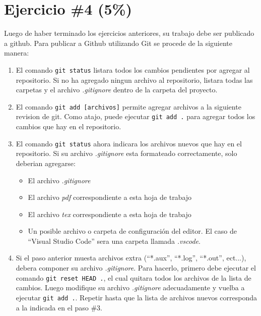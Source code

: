 \documentclass{article}
\begin{document}
\section*{Ejercicio \#4 (5\%)}
Luego de haber terminado los ejercicios anteriores, su trabajo debe
ser publicado a github. Para publicar a Github utilizando Git se procede
de la siguiente manera:
\begin{enumerate}
        \item {
                El comando \texttt{git status} listara todos los
                cambios pendientes por agregar al repositorio. Si no
                ha agregado ningun archivo al repositorio, listara todas
                las carpetas y el archivo \emph{.gitignore} dentro de la
                carpeta del proyecto.
        }
        \item{
                El comando \texttt{git add [archivos]} permite agregar
                archivos a la siguiente revision de git. Como atajo,
                puede ejecutar \texttt{git add .} para agregar todos
                los cambios que hay en el repositorio.
        }
        \item {
                El comando \texttt{git status} ahora indicara los archivos
                nuevos que hay en el repositorio. Si su archivo \emph{.gitignore}
                esta formateado correctamente, solo deberian agregarse:
                \begin{itemize}
                        \item{El archivo \emph{.gitignore}}
                        \item{El archivo \emph{pdf} correspondiente a esta hoja de trabajo}
                        \item{El archivo \emph{tex} correspondiente a esta hoja de trabajo}
                        \item{Un posible archivo o carpeta de configuraci\'on del editor.
                        El caso de ``Visual Studio Code'' sera una carpeta llamada \emph{.vscode}.}
                \end{itemize}
        }
        \item{
                Si el paso anterior muesta archivos extra (``*.aux'', ``*.log'', ``*.out'', ect...),
                debera componer su archivo \emph{.gitignore}. Para hacerlo, primero
                debe ejecutar el comando \texttt{git reset HEAD .}, el cual quitara
                todos los archivos de la lista de cambios. Luego modifique su archivo \emph{.gitignore}
                adecuadamente y vuelba a ejecutar \texttt{git add .}. Repetir hasta
                que la lista de archivos nuevos corresponda a la indicada en el paso \#3.
        }
\end{enumerate}




\end{document}
